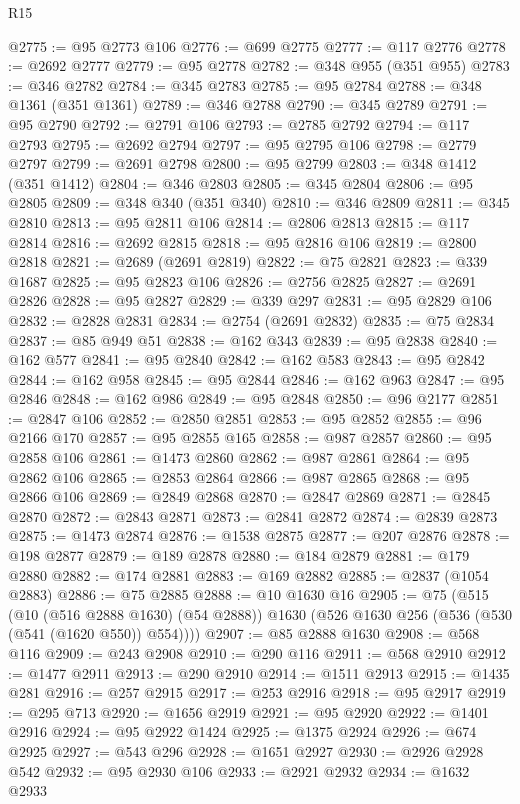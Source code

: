 \begin{lexlean}{R15}
\begin{coremodule}
{{{{{{{{{{{{{{{{{{{{{{{{{{{{{{{{{{{{{{{{{{{{{{{{{{{{{{{{{{{{{{{{{{{{{{@2775 := @95 @2773 @106
@2776 := @699 @2775
@2777 := @117 @2776
@2778 := @2692 @2777
@2779 := @95 @2778
@2782 := @348 @955 (@351 @955)
@2783 := @346 @2782
@2784 := @345 @2783
@2785 := @95 @2784
@2788 := @348 @1361 (@351 @1361)
@2789 := @346 @2788
@2790 := @345 @2789
@2791 := @95 @2790
@2792 := @2791 @106
@2793 := @2785 @2792
@2794 := @117 @2793
@2795 := @2692 @2794
@2797 := @95 @2795 @106
@2798 := @2779 @2797
@2799 := @2691 @2798
@2800 := @95 @2799
@2803 := @348 @1412 (@351 @1412)
@2804 := @346 @2803
@2805 := @345 @2804
@2806 := @95 @2805
@2809 := @348 @340 (@351 @340)
@2810 := @346 @2809
@2811 := @345 @2810
@2813 := @95 @2811 @106
@2814 := @2806 @2813
@2815 := @117 @2814
@2816 := @2692 @2815
@2818 := @95 @2816 @106
@2819 := @2800 @2818
@2821 := @2689 (@2691 @2819)
@2822 := @75 @2821
@2823 := @339 @1687
@2825 := @95 @2823 @106
@2826 := @2756 @2825
@2827 := @2691 @2826
@2828 := @95 @2827
@2829 := @339 @297
@2831 := @95 @2829 @106
@2832 := @2828 @2831
@2834 := @2754 (@2691 @2832)
@2835 := @75 @2834
@2837 := @85 @949 @51
@2838 := @162 @343
@2839 := @95 @2838
@2840 := @162 @577
@2841 := @95 @2840
@2842 := @162 @583
@2843 := @95 @2842
@2844 := @162 @958
@2845 := @95 @2844
@2846 := @162 @963
@2847 := @95 @2846
@2848 := @162 @986
@2849 := @95 @2848
@2850 := @96 @2177
@2851 := @2847 @106
@2852 := @2850 @2851
@2853 := @95 @2852
@2855 := @96 @2166 @170
@2857 := @95 @2855 @165
@2858 := @987 @2857
@2860 := @95 @2858 @106
@2861 := @1473 @2860
@2862 := @987 @2861
@2864 := @95 @2862 @106
@2865 := @2853 @2864
@2866 := @987 @2865
@2868 := @95 @2866 @106
@2869 := @2849 @2868
@2870 := @2847 @2869
@2871 := @2845 @2870
@2872 := @2843 @2871
@2873 := @2841 @2872
@2874 := @2839 @2873
@2875 := @1473 @2874
@2876 := @1538 @2875
@2877 := @207 @2876
@2878 := @198 @2877
@2879 := @189 @2878
@2880 := @184 @2879
@2881 := @179 @2880
@2882 := @174 @2881
@2883 := @169 @2882
@2885 := @2837 (@1054 @2883)
@2886 := @75 @2885
@2888 := @10 @1630 @16
@2905 := @75
    (@515
      (@10 (@516 @2888 @1630) (@54 @2888))
      @1630
      (@526 @1630 @256 (@536 (@530 (@541 (@1620 @550)) @554))))
@2907 := @85 @2888 @1630
@2908 := @568 @116
@2909 := @243 @2908
@2910 := @290 @116
@2911 := @568 @2910
@2912 := @1477 @2911
@2913 := @290 @2910
@2914 := @1511 @2913
@2915 := @1435 @281
@2916 := @257 @2915
@2917 := @253 @2916
@2918 := @95 @2917
@2919 := @295 @713
@2920 := @1656 @2919
@2921 := @95 @2920
@2922 := @1401 @2916
@2924 := @95 @2922 @1424
@2925 := @1375 @2924
@2926 := @674 @2925
@2927 := @543 @296
@2928 := @1651 @2927
@2930 := @2926 @2928 @542
@2932 := @95 @2930 @106
@2933 := @2921 @2932
@2934 := @1632 @2933
}}}}}}}}}}}}}}}}}}}}}}}}}}}}}}}}}}}}}}}}}}}}}}}}}}}}}}}}}}}}}}}}}}}}}}
\end{coremodule}
\end{lexlean}
